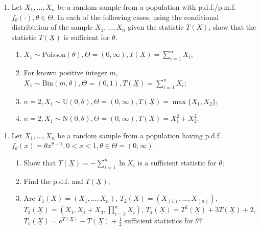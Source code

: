 \documentclass[11pt]{article}
\begin{document}
\begin{enumerate}
    \item[3.] Let $X_1, \dots, X_n$ be a random sample from a population with p.d.f./p.m.f. $f_\theta(\cdot), \theta \in \Theta$. In each of the following cases, using the conditional distribution of the sample $X_1, \dots, X_n$ given the statistic $T(\underline{X})$, show that the statistic $T(\underline{X})$ is sufficient for $\theta$.
    \begin{enumerate}
        \item[(a)] $X_1 \sim \text{Poisson}(\theta), \Theta = (0, \infty), T(\underline{X}) = \sum_{i=1}^n X_i$;
        \item[(b)] For known positive integer $m$, $X_1 \sim \text{Bin}(m, \theta), \Theta = (0, 1), T(\underline{X}) = \sum_{i=1}^n X_i$;
        \item[(c)] $n = 2, X_1 \sim \text{U}(0, \theta), \Theta = (0, \infty), T(\underline{X}) = \max\{X_1, X_2\}$;
        \item[(d)] $n = 2, X_1 \sim \text{N}(0, \theta), \Theta = (0, \infty), T(\underline{X}) = X_1^2 + X_2^2$.
    \end{enumerate}
\end{enumerate}

\vspace{1em}

\begin{enumerate}
    \item[4.] Let $X_1, \dots, X_n$ be a random sample from a population having p.d.f. $f_\theta(x) = \theta x^{\theta-1}, 0 < x < 1, \theta \in \Theta = (0, \infty)$.
    \begin{enumerate}
        \item[(a)] Show that $T(\underline{X}) = -\sum_{i=1}^n \ln X_i$ is a sufficient statistic for $\theta$;
        \item[(b)] Find the p.d.f. and $T(\underline{X})$;
        \item[(c)] Are $T_1(\underline{X}) = (X_1, \dots, X_n)$, $T_2(\underline{X}) = (X_{(1)}, \dots, X_{(n)})$, $T_3(\underline{X}) = (X_1, X_1 + X_2, \prod_{i=3}^n X_i)$, $T_4(\underline{X}) = T^2(\underline{X}) + 3T(\underline{X}) + 2$, $T_5(\underline{X}) = e^{T(\underline{X})} - T(\underline{X}) + \frac{1}{2}$ sufficient statistics for $\theta$?
    \end{enumerate}
\end{enumerate}
\end{document}
